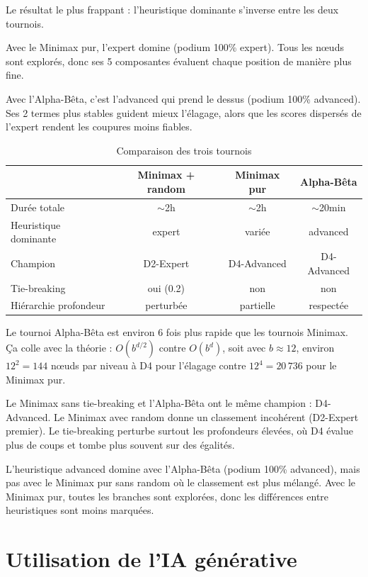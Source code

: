 \documentclass[a4paper, 12pt]{report}
\begin{document}
Le résultat le plus frappant : l'heuristique dominante s'inverse entre les deux tournois.

Avec le Minimax pur, l'expert domine (podium 100\% expert). Tous les n\oe{}uds sont explorés, donc ses 5 composantes évaluent chaque position de manière plus fine.

Avec l'Alpha-Bêta, c'est l'advanced qui prend le dessus (podium 100\% advanced). Ses 2 termes plus stables guident mieux l'élagage, alors que les scores dispersés de l'expert rendent les coupures moins fiables.

\begin{table}[H]
\centering
\caption{Comparaison des trois tournois}
\label{tab:comparaison}
\begin{tabular}{lccc}
\toprule
& \textbf{Minimax + random} & \textbf{Minimax pur} & \textbf{Alpha-Bêta} \\
\midrule
Durée totale & $\sim$2h & $\sim$2h & $\sim$20min \\
Heuristique dominante & expert & variée & advanced \\
Champion & D2-Expert & D4-Advanced & D4-Advanced \\
Tie-breaking & oui (0.2) & non & non \\
Hiérarchie profondeur & perturbée & partielle & respectée \\
\bottomrule
\end{tabular}
\end{table}

Le tournoi Alpha-Bêta est environ 6 fois plus rapide que les tournois Minimax. Ça colle avec la théorie : $O(b^{d/2})$ contre $O(b^d)$, soit avec $b \approx 12$, environ $12^2 = 144$ n\oe{}uds par niveau à D4 pour l'élagage contre $12^4 = 20\,736$ pour le Minimax pur.

Le Minimax sans tie-breaking et l'Alpha-Bêta ont le même champion : D4-Advanced. Le Minimax avec random donne un classement incohérent (D2-Expert premier). Le tie-breaking perturbe surtout les profondeurs élevées, où D4 évalue plus de coups et tombe plus souvent sur des égalités.

L'heuristique advanced domine avec l'Alpha-Bêta (podium 100\% advanced), mais pas avec le Minimax pur sans random où le classement est plus mélangé. Avec le Minimax pur, toutes les branches sont explorées, donc les différences entre heuristiques sont moins marquées.

\section{Utilisation de l'IA générative}
\end{document}
